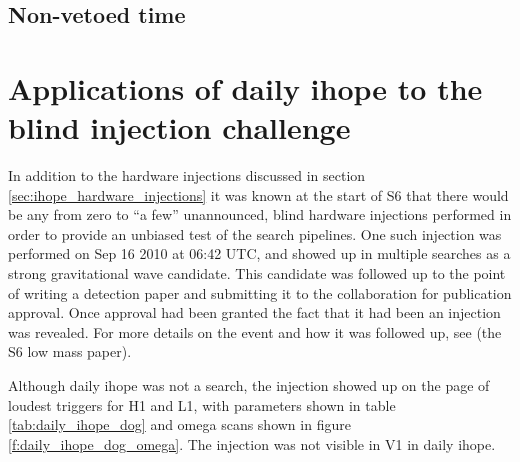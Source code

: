 \subsection{Non-vetoed time}

\section{Applications of daily ihope to the blind injection challenge}

In addition to the hardware injections discussed in section
\ref{sec:ihope_hardware_injections} it was known at the start of S6
that there would be any from zero to ``a few'' unannounced, blind
hardware injections performed in order to provide an unbiased test of
the search pipelines.  One such injection was performed on Sep 16
2010 at 06:42 UTC, and showed up in multiple searches as a strong
gravitational wave candidate.  This candidate was followed up to the
point of writing a detection paper and submitting it to the
collaboration for publication approval.  Once approval had been
granted the fact that it had been an injection was revealed.  For more
details on the event and how it was followed up, see (the S6 low mass
paper).

Although daily ihope was not a search, the injection showed up on the
page of loudest triggers for H1 and L1, with parameters shown in table
\ref{tab:daily_ihope_dog} and omega scans shown in figure
\ref{f:daily_ihope_dog_omega}.  The injection was not visible in V1 in
daily ihope.

